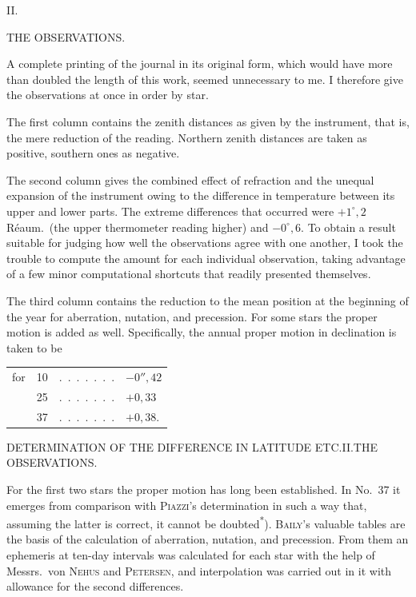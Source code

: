 \clearpage
\vspace*{18mm}
\begin{center}
{\large II.}\par\medskip
{\Large THE OBSERVATIONS.}
\end{center}

A complete printing of the journal in its original form, which would have more than doubled
the length of this work, seemed unnecessary to me. I therefore give the observations at once
in order by star.

The first column contains the zenith distances as given by the instrument, that is, the mere
reduction of the reading. Northern zenith distances are taken as positive, southern ones as negative.

The second column gives the combined effect of refraction and the unequal expansion of the
instrument owing to the difference in temperature between its upper and lower parts. The extreme
differences that occurred were $+1^\circ{,}2$ Réaum.\ (the upper thermometer reading higher) and
$-0^\circ{,}6$. To obtain a result suitable for judging how well the observations agree with
one another, I took the trouble to compute the amount for each individual observation, taking
advantage of a few minor computational shortcuts that readily presented themselves.

The third column contains the reduction to the mean position at the beginning of the year
for aberration, nutation, and precession. For some stars the proper motion is added as well.
Specifically, the annual proper motion in declination is taken to be
\begin{center}
\begin{tabular}{@{}lr@{\quad}c@{\quad}l@{}}
for&10&.\ .\ .\ .\ .\ .\ .&$-0''{,}42$\\
&25&.\ .\ .\ .\ .\ .\ .&$+0{,}33$\\
&37&.\ .\ .\ .\ .\ .\ .&$+0{,}38$.
\end{tabular}
\end{center}

\clearpage
\noindent\parbox[t]{\dimexpr\textwidth-10mm\relax}{\centering\scriptsize DETERMINATION OF THE DIFFERENCE IN LATITUDE ETC.\quad II.\quad THE OBSERVATIONS.}\par
\noindent For the first two stars the proper motion has long been established. In No.\ 37 it
emerges from comparison with \textsc{Piazzi}'s determination in such a way that, assuming the
latter is correct, it cannot be doubted\textsuperscript{*}). \textsc{Baily}'s valuable tables
are the basis of the calculation of aberration, nutation, and precession. From them an
ephemeris at ten-day intervals was calculated for each star with the help of Messrs.\
von \textsc{Nehus} and \textsc{Petersen}, and interpolation was carried out in it with allowance
for the second differences.

